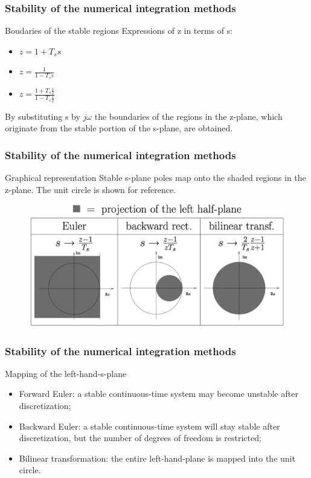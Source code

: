\begin{frame}
	\frametitle{Stability of the numerical integration methods}
	\begin{block}{Boudaries of the stable regions}
		Expressions of z in terms of s:
		\begin{itemize}
			\item $z = 1 + T_ss$
			\item $z = \frac{1}{1 - T_ss}$
			\item $z = \frac{1 + T_s\frac{s}{2}}{1 - T_s\frac{s}{2}}$
		\end{itemize}
		By substituting s by $j\omega$ the boundaries of the regions in the z-plane, which originate from the stable portion of the s-plane, are obtained.
	\end{block}
\end{frame}

\begin{frame}
	\frametitle{Stability of the numerical integration methods}
	\begin{block}{Graphical representation}
		Stable s-plane poles map onto the shaded regions in the z-plane. The unit circle is shown for reference.
	\begin{figure}
		\centering
		\includegraphics[width=0.85\linewidth]{Stabiliteit}
	\end{figure}
	\end{block}
\end{frame}

\begin{frame}
	\frametitle{Stability of the numerical integration methods}
	\begin{block}{Mapping of the left-hand-s-plane}
		\begin{itemize}
			\item Forward Euler: a stable continuous-time system may become unstable after discretization;\\
			\item Backward Euler: a stable continuous-time system will stay stable after discretization, but the number of degrees of freedom is restricted;\\
			\item Bilinear transformation: the entire left-hand-plane is mapped into the unit circle.\\
		\end{itemize}
	\end{block}
\end{frame}

